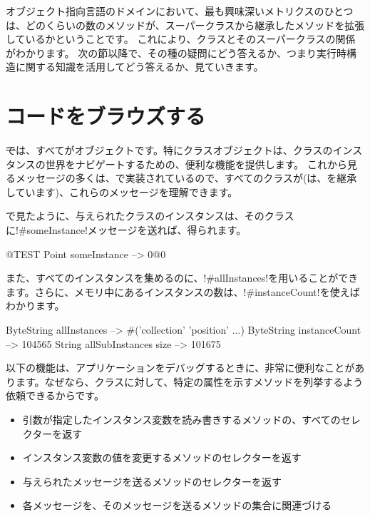 \documentclass[a4paper,10pt,twoside]{book}
\begin{document}
オブジェクト指向言語のドメインにおいて、最も興味深いメトリクスのひとつは、どのくらいの数のメソッドが、スーパークラスから継承したメソッドを拡張しているかということです。
これにより、クラスとそのスーパークラスの関係がわかります。
次の節以降で、その種の疑問にどう答えるか、つまり実行時構造に関する知識を活用してどう答えるか、見ていきます。

\section{コードをブラウズする}

\st では、すべてがオブジェクトです。特にクラスオブジェクトは、クラスのインスタンスの世界をナビゲートするための、便利な機能を提供します。
これから見るメッセージの多くは、で実装されているので、すべてのクラスが(は、を継承しています)、これらのメッセージを理解できます。

で見たように、与えられたクラスのインスタンスは、そのクラスに\ct!#someInstance!メッセージを送れば、得られます。
\begin{code}{@TEST} %
Point someInstance --> 0@0
\end{code}

また、すべてのインスタンスを集めるのに、\ct!#allInstances!を用いることができます。さらに、メモリ中にあるインスタンスの数は、\ct!#instanceCount!を使えばわかります。

\begin{code}{} %
ByteString allInstances        --> #('collection' 'position'  ...)
ByteString instanceCount    --> 104565
String allSubInstances size -->  101675
\end{code}

以下の機能は、アプリケーションをデバッグするときに、非常に便利なことがあります。なぜなら、クラスに対して、特定の属性を示すメソッドを列挙するよう依頼できるからです。
\begin{itemize}
\item {} 引数が指定したインスタンス変数を読み書きするメソッドの、すべてのセレクターを返す
\item {} インスタンス変数の値を変更するメソッドのセレクターを返す
\item {} 与えられたメッセージを送るメソッドのセレクターを返す
\item {} 各メッセージを、そのメッセージを送るメソッドの集合に関連づける
\end{itemize}
\end{document}
